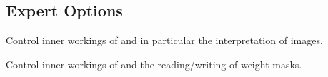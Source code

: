 

\subsection[Expert Options]{\label{sec:expert-options}%
  Expert Options}%




\ifenblend
  Control inner workings of \App{} and in particular the interpretation of images.
\fi

\ifenfuse
  Control inner workings of \App{} and the reading\slash writing of weight masks.
\fi


